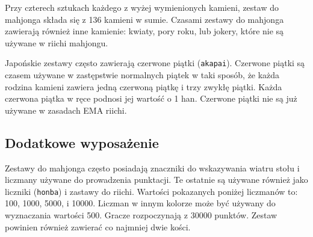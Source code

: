 Przy czterech sztukach każdego z wyżej wymienionych kamieni, zestaw do mahjonga składa się z 136 kamieni w sumie. Czasami zestawy do mahjonga zawierają również inne kamienie: kwiaty, pory roku, lub jokery, które nie są używane w riichi mahjongu.

Japońskie zestawy często zawierają czerwone piątki (\texttt{akapai}). Czerwone piątki są czasem używane w zastępstwie normalnych piątek w taki sposób, że każda rodzina kamieni zawiera jedną czerwoną piątkę i trzy zwykłę piątki. Każda czerwona piątka w ręce podnosi jej wartość o 1 han. Czerwone piątki nie są już używane w zasadach EMA riichi.

\subsection{Dodatkowe wyposażenie}

Zestawy do mahjonga często posiadają znaczniki do wskazywania wiatru stołu i liczmany używane do prowadzenia punktacji. Te ostatnie są używane również jako liczniki (\texttt{honba}) i zastawy do riichi. Wartości pokazanych poniżej liczmanów to: 100, 1000, 5000, i 10000. Liczman w innym kolorze może być używany do wyznaczania wartości 500. Gracze rozpoczynają z 30000 punktów. Zestaw powinien również zawierać co najmniej dwie kości.

\begin{center}
  
\end{center}

